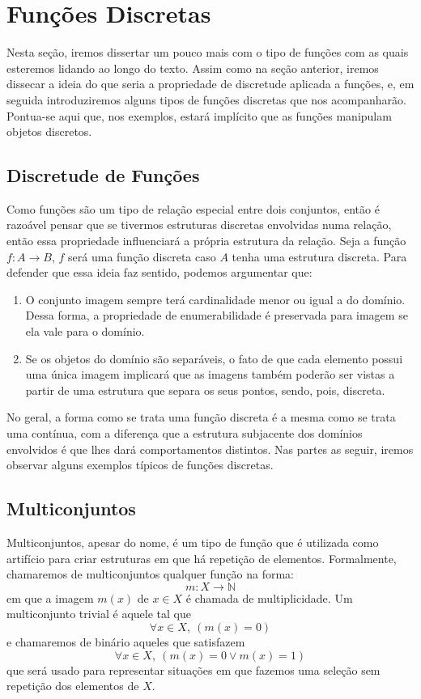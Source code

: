 \section{Funções Discretas}

Nesta seção, iremos dissertar um pouco mais com o tipo de funções com as quais
esteremos lidando ao longo do texto. Assim como na seção anterior, iremos
dissecar a ideia do que seria a propriedade de discretude aplicada a funções,
e, em seguida introduziremos alguns tipos de funções discretas que nos acompanharão.
Pontua-se aqui que, nos exemplos, estará implícito que as funções manipulam objetos
discretos.

\subsection{Discretude de Funções}

Como funções são um tipo de relação especial entre dois conjuntos, então
é razoável pensar que se tivermos estruturas discretas envolvidas numa relação,
então essa propriedade influenciará a própria estrutura da relação. Seja
a função $f: A \to B$, $f$ será uma função discreta caso $A$ tenha uma estrutura
discreta. Para defender que essa ideia faz sentido, podemos argumentar que:

\begin{enumerate}
  \item O conjunto imagem sempre terá cardinalidade menor ou igual a do domínio.
    Dessa forma, a propriedade de enumerabilidade é preservada para imagem se
    ela vale para o domínio.

  \item Se os objetos do domínio são separáveis, o fato de que cada elemento
    possui uma única imagem implicará que as imagens também poderão ser vistas
    a partir de uma estrutura que separa os seus pontos, sendo, pois, discreta.
\end{enumerate}

No geral, a forma como se trata uma função discreta é a mesma como se trata
uma contínua, com a diferença que a estrutura subjacente dos domínios envolvidos
é que lhes dará comportamentos distintos. Nas partes as seguir, iremos
observar alguns exemplos típicos de funções discretas.

\subsection{Multiconjuntos}

Multiconjuntos, apesar do nome, é um tipo de função que é utilizada como
artifício para criar estruturas em que há repetição de elementos. Formalmente,
chamaremos de multiconjuntos qualquer função na forma:
\[
  m: X \to \mathbb{N}
\]
em que a imagem $m(x)$ de $x \in X$ é chamada de multiplicidade. Um multiconjunto
trivial é aquele tal que
\[
  \forall x \in X,\ ( m(x) = 0 )
\]
e chamaremos de binário aqueles que satisfazem
\[
  \forall x \in X,\ ( m(x) = 0 \lor m(x) = 1 )
\]
que será usado para representar situações em que fazemos uma seleção sem repetição
dos elementos de $X$.

